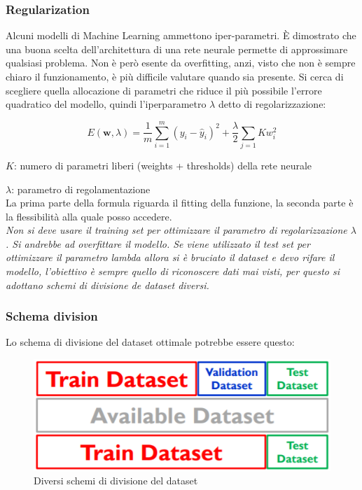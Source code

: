 \subsubsection{Regularization}
Alcuni modelli di Machine Learning ammettono iper-parametri. \`E dimostrato che una buona scelta dell'architettura di una rete neurale  permette  di approssimare qualsiasi problema. Non è però esente da overfitting, anzi, visto che non è sempre chiaro il funzionamento, è più difficile valutare quando sia presente. Si cerca di scegliere quella allocazione di parametri che riduce il più possibile l'errore quadratico del modello, quindi l'iperparametro $\lambda$ detto di regolarizzazione:

\[E(\textbf{w},\lambda) = \frac{1}{m} \sum_{i=1}^{m}(y_i - \hat{y}_i)^2 + \frac{\lambda}{2} \sum_{j=1}{K} w_i^2 \]

$K$: numero di parametri liberi (weights + thresholds) della rete neurale

$\lambda$: parametro di regolamentazione\\
La prima parte della formula riguarda il fitting della funzione, la seconda parte \`e la flessibilit\`a alla quale posso accedere.\\

\textit{Non si deve usare il training set per ottimizzare il parametro di regolarizzazione $\lambda$. Si andrebbe ad overfittare il modello. Se viene utilizzato il test set per ottimizzare il parametro lambda allora si è bruciato il dataset e devo rifare il modello, l'obiettivo è sempre quello di riconoscere dati mai visti, per questo si adottano schemi di divisione de dataset diversi.}

\subsubsection{Schema division}
Lo schema di divisione del dataset ottimale potrebbe essere questo:
\begin{figure}[H]
	\centering
	\includegraphics[height=0.3 \linewidth]{classification/pict/schema_dataset.png}
	\caption{Diversi schemi di divisione del dataset}
\end{figure}

